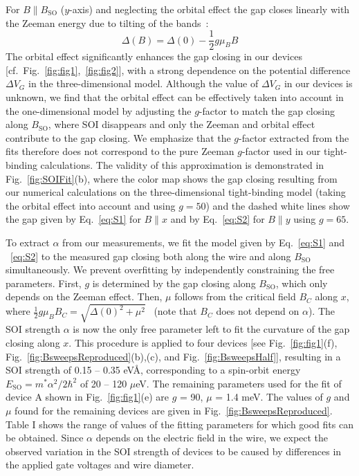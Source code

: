 For $B \parallel B_{\mathrm{SO}}$ ($y$-axis) and neglecting the orbital effect the gap closes linearly with the Zeeman energy due to tilting of the bands~\cite{Osca2014,Rex2014}:
\begin{equation}\label{eq:S2}
\Delta(B) = \Delta(0) - \frac{1}{2}g\mu_BB
\end{equation}
The orbital effect significantly enhances the gap closing in our devices [cf.~Fig.~\ref{fig:fig1},~\ref{fig:fig2}], with a  strong dependence on the potential difference $\Delta V_G$ in the three-dimensional model.
Although the value of $\Delta V_G$ in our devices is unknown, we find that the orbital effect can be effectively taken into account in the one-dimensional model by adjusting the $g$-factor to match the gap closing along $B_{\mathrm{SO}}$, where SOI disappears and only the Zeeman and orbital effect contribute to the gap closing.
We emphasize that the $g$-factor extracted from the fits therefore does not correspond to the pure Zeeman $g$-factor used in our tight-binding calculations.
The validity of this approximation is demonstrated in Fig.~\ref{fig:SOIFit}(b), where the color map shows the gap closing resulting from our numerical calculations on the three-dimensional tight-binding model (taking the orbital effect into account and using $g = 50$) and the dashed white lines show the gap given by Eq.~\eqref{eq:S1} for $B\parallel x$ and by Eq.~\eqref{eq:S2} for $B\parallel y$ using $g=65$.

To extract $\alpha$ from our measurements, we fit the model given by Eq.~\eqref{eq:S1} and ~\eqref{eq:S2} to the measured gap closing both along the wire and along $B_{\mathrm{SO}}$ simultaneously.
We prevent overfitting by independently constraining the free parameters.
First, $g$ is determined by the gap closing along $B_{\mathrm{SO}}$, which only depends on the Zeeman effect.
Then, $\mu$ follows from the critical field $B_C$ along $x$, where $\frac{1}{2}g\mu_BB_C = \sqrt{\Delta(0)^2+\mu^2}$~\cite{Lutchyn2010,Oreg2010} (note that $B_C$ does not depend on $\alpha$).
The SOI strength $\alpha$ is now the only free parameter left to fit the curvature of the gap closing along $x$.
This procedure is applied to four devices [see Fig.~\ref{fig:fig1}(f), Fig.~\ref{fig:BsweepsReproduced}(b),(c), and Fig.~\ref{fig:BsweepsHalf}], resulting in a SOI strength of 0.15 -- 0.35 eV\AA, corresponding to a spin-orbit energy $E_{\mathrm{SO}}=m^*\alpha^2/2\hbar^2$ of 20 -- 120 $\mu$eV.
The remaining parameters used for the fit of device A shown in Fig.~\ref{fig:fig1}(e) are $g$ = 90, $\mu$ = 1.4 meV.
The values of $g$ and $\mu$ found for the remaining devices are given in Fig.~\ref{fig:BsweepsReproduced}.
Table I shows the range of values of the fitting parameters for which good fits can be obtained.
Since $\alpha$ depends on the electric field in the wire, we expect the observed variation in the SOI strength of devices to be caused by differences in the applied gate voltages and wire diameter.

